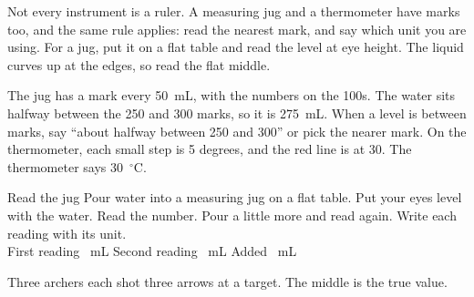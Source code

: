 
Not every instrument is a ruler. A measuring jug and a thermometer have marks too, and the same rule applies: read the nearest mark, and say which unit you are using. For a jug, put it on a flat table and read the level at eye height. The liquid curves up at the edges, so read the flat middle.

\begin{center}
\end{center}
The jug has a mark every 50~mL, with the numbers on the 100s. The water sits halfway between the 250 and 300 marks, so it is 275~mL. When a level is between marks, say ``about halfway between 250 and 300'' or pick the nearer mark. On the thermometer, each small step is 5 degrees, and the red line is at 30. The thermometer says 30~$^\circ$C.

\begin{tryit}{Read the jug}
Pour water into a measuring jug on a flat table. Put your eyes level with the water. Read the number. Pour a little more and read again. Write each reading with its unit.\\[4pt]
First reading \wline[2cm]~mL \quad Second reading \wline[2cm]~mL \quad Added \wline[2cm]~mL
\end{tryit}

Three archers each shot three arrows at a target. The middle is the true value.

